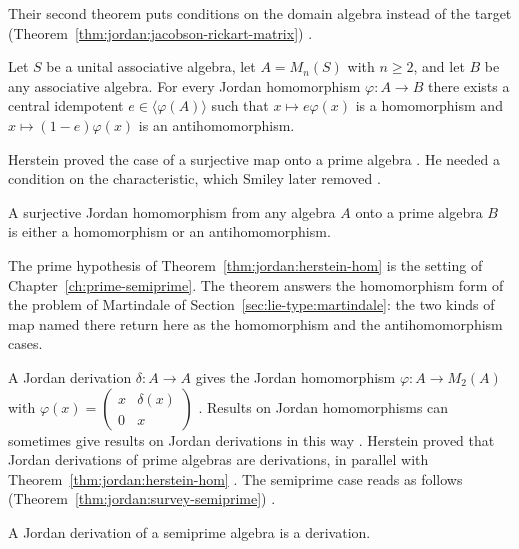 Their second theorem puts conditions on the domain algebra instead of the target (Theorem~\ref{thm:jordan:jacobson-rickart-matrix})
\cite[p.~211]{BresarZelmanov2025}.\begin{theorem}\label{thm:jordan:jacobson-rickart-matrix}
Let $S$ be a unital associative algebra, let $A=M_{n}(S)$ with $n\geq2$, and let $B$ be any
associative algebra. For every Jordan homomorphism $\varphi\colon A\to B$ there exists a central
idempotent $e\in\langle\varphi(A)\rangle$ such that $x\mapsto e\varphi(x)$ is a homomorphism and
$x\mapsto(1-e)\varphi(x)$ is an antihomomorphism.
\end{theorem}

Herstein proved the case of a surjective map onto a prime algebra
\cite[p.~212]{BresarZelmanov2025}. He needed a condition on the
characteristic, which Smiley later removed \cite[p.~212]{BresarZelmanov2025}.

\begin{theorem}\label{thm:jordan:herstein-hom}
A surjective Jordan homomorphism from any algebra $A$ onto a prime algebra $B$ is either a
homomorphism or an antihomomorphism.
\end{theorem}

The prime hypothesis of Theorem~\ref{thm:jordan:herstein-hom} is the setting
of Chapter~\ref{ch:prime-semiprime}. The theorem answers the homomorphism form
of the problem of Martindale of Section~\ref{sec:lie-type:martindale}: the two
kinds of map named there return here as the homomorphism and the
antihomomorphism cases.

A Jordan derivation $\delta\colon A\to A$ gives the
Jordan homomorphism $\varphi\colon A\to M_{2}(A)$ with $\varphi(x)=\begin{pmatrix}x&\delta(x)\\0&x\end{pmatrix}$
\cite[Section~11, p.~224]{BresarZelmanov2025}. Results on Jordan homomorphisms can sometimes give
results on Jordan derivations in this way \cite[p.~224]{BresarZelmanov2025}. Herstein proved that Jordan
derivations of prime algebras are derivations, in parallel with Theorem~\ref{thm:jordan:herstein-hom}
\cite[p.~224]{BresarZelmanov2025}. The semiprime case reads as follows (Theorem~\ref{thm:jordan:survey-semiprime}) \cite[p.~225]{BresarZelmanov2025}.

\begin{theorem}\label{thm:jordan:survey-semiprime}
A Jordan derivation of a semiprime algebra is a derivation.
\end{theorem}

